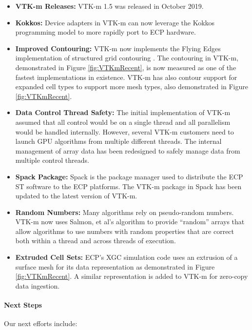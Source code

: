 \begin{itemize}
\item \textbf{VTK-m Releases:}
  VTK-m 1.5 was released in October 2019.
\item \textbf{Kokkos:}
  Device adapters in VTK-m can now leverage the Kokkos programming model to more rapidly port to ECP hardware.
\item \textbf{Improved Contouring:}
  VTK-m now implements the Flying Edges implementation of structured grid contouring \cite{Schroeder2015}.
  The contouring in VTK-m, demonstrated in Figure \ref{fig:VTKmRecent}, is now measured as one of the fastest implementations in existence.
  VTK-m has also contour support for expanded cell types to support more mesh types, also demonstrated in Figure \ref{fig:VTKmRecent}.
\item \textbf{Data Control Thread Safety:}
  The initial implementation of VTK-m assumed that all control would be on a single thread and all parallelism would be handled internally.
  However, several VTK-m customers need to launch GPU algorithms from multiple different threads.
  The internal management of array data has been redesigned to safely manage data from multiple control threads.
\item \textbf{Spack Package:}
  Spack \cite{Gamblin2015} is the package manager used to distribute the ECP ST software to the ECP platforms.
  The VTK-m package in Spack has been updated to the latest version of VTK-m.
\item \textbf{Random Numbers:}
  Many algorithms rely on pseudo-random numbers.
  VTK-m now uses Salmon, et al's algorithm \cite{Salmon2011} to provide ``random'' arrays that allow algorithms to use numbers with random properties that are correct both within a thread and across threads of execution.
\item \textbf{Extruded Cell Sets:}
  ECP's XGC simulation code uses an extrusion of a surface mesh for its data representation as demonstrated in Figure \ref{fig:VTKmRecent}.
  A similar representation is added to VTK-m for zero-copy data ingestion.
\end{itemize}

\paragraph{Next Steps}
Our next efforts include:


